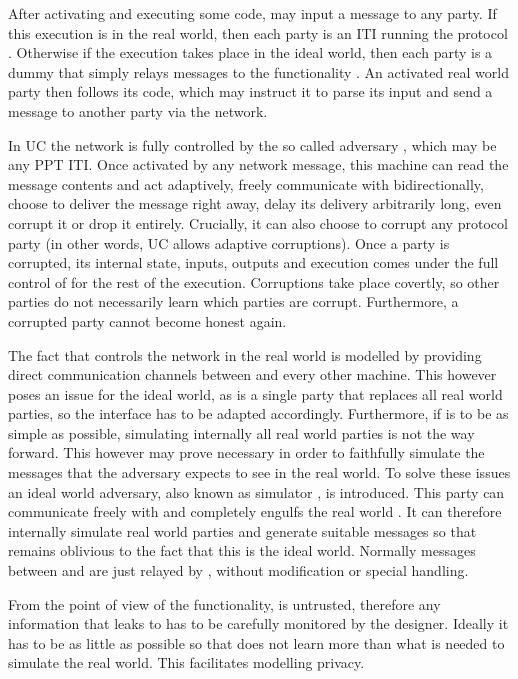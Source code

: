   After activating and executing some code, \environment may input a message to
  any party. If this execution is in the real world, then each party is an ITI
  running the protocol \prot. Otherwise if the execution takes place in the
  ideal world, then each party is a dummy that simply relays messages to the
  functionality \func. An activated real world party then follows its code,
  which may instruct it to parse its input and send a message to another party
  via the network.

  In UC the network is fully controlled by the so called adversary \adversary,
  which may be any PPT ITI. Once activated by any network message, this machine
  can read the message contents and act adaptively, freely communicate with
  \environment bidirectionally, choose to deliver the message right away, delay
  its delivery arbitrarily long, even corrupt it or drop it entirely. Crucially,
  it can also choose to corrupt any protocol party (in other words, UC allows
  adaptive corruptions). Once a party is corrupted, its internal state, inputs,
  outputs and execution comes under the full control of \adversary for the rest
  of the execution. Corruptions take place covertly, so other parties do not
  necessarily learn which parties are corrupt. Furthermore, a corrupted party
  cannot become honest again.

  The fact that \adversary controls the network in the real world is modelled by
  providing direct communication channels between \adversary and every other
  machine. This however poses an issue for the ideal world, as \func is a single
  party that replaces all real world parties, so the interface has to be adapted
  accordingly. Furthermore, if \func is to be as simple as possible, simulating
  internally all real world parties is not the way forward. This however may
  prove necessary in order to faithfully simulate the messages that the
  adversary expects to see in the real world. To solve these issues an ideal
  world adversary, also known as simulator \simulator, is introduced. This party
  can communicate freely with \func and completely engulfs the real world
  \adversary. It can therefore internally simulate real world parties and
  generate suitable messages so that \adversary remains oblivious to the fact
  that this is the ideal world. Normally messages between \adversary and
  \environment are just relayed by \simulator, without modification or special
  handling.

  From the point of view of the functionality, \simulator is untrusted,
  therefore any information that \func leaks to \simulator has to be carefully
  monitored by the designer. Ideally it has to be as little as possible so that
  \simulator does not learn more than what is needed to simulate the real world.
  This facilitates modelling privacy.

